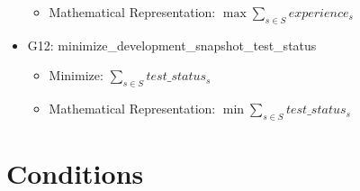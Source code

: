\documentclass{article}
\begin{document}
\begin{itemize}
\begin{itemize}
            \item Mathematical Representation: $\max \sum_{s \in S} experience_s$
        \end{itemize}
    \item G12: minimize\_development\_snapshot\_test\_status
        \begin{itemize}
            \item Minimize: $\sum_{s \in S} test\_status_s$
            \item Mathematical Representation: $\min \sum_{s \in S} test\_status_s$
        \end{itemize}
\end{itemize}

\section{Conditions}
\end{document}
